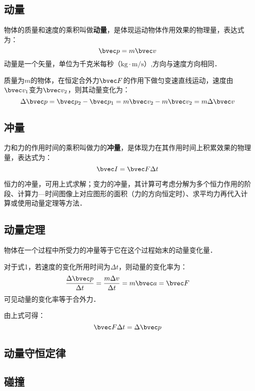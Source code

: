 
\begin{issues}
\issueDraft
\issueTODO
\end{issues}


\subsection{动量}

物体的质量和速度的乘积叫做\textbf{动量}，是体现运动物体作用效果的物理量，表达式为：
\begin{equation}
\bvec p = m\bvec v
\end{equation}
动量是一个矢量，单位为千克米每秒（$\mathrm{kg\cdot m/s}$）,方向与速度方向相同．

质量为$m$的物体，在恒定合外力$\bvec F $的作用下做匀变速直线运动，速度由$\bvec v_1$变为$\bvec v_2$，则其动量变化为：
\begin{equation}
\Delta \bvec p =\bvec p_2 - \bvec p_1 = m\bvec v_2 - m\bvec v_2 = m\Delta \bvec v
\end{equation}

\subsection{冲量}

力和力的作用时间的乘积叫做力的\textbf{冲量}，是体现力在其作用时间上积累效果的物理量，表达式为：
\begin{equation}
\bvec I=\bvec F \Delta t
\end{equation}

恒力的冲量，可用上式求解；变力的冲量，其计算可考虑分解为多个恒力作用的阶段、计算力—时间图像上对应图形的面积（力的方向恒定时）、求平均力再代入计算或使用动量定理等方法．

\subsection{动量定理}

物体在一个过程中所受力的冲量等于它在这个过程始末的动量变化量．

对于式1，若速度的变化所用时间为$\Delta t$，则动量的变化率为：
\begin{equation}
\frac{\Delta \bvec p}{\Delta t}=\frac{m\Delta v}{\Delta t}=m\bvec a=\bvec F
\end{equation}
可见动量的变化率等于合外力．

由上式可得：
\begin{equation}
\bvec F\Delta t=\Delta \bvec p
\end{equation}

\subsection{动量守恒定律}

\subsection{碰撞}

